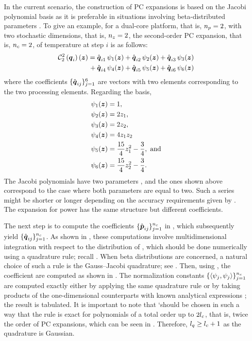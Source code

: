 In the current scenario, the construction of \ac{PC} expansions is based on the
Jacobi polynomial basis as it is preferable in situations involving
beta-distributed parameters \cite{xiu2010}. To give an example, for a dual-core
platform, that is, ${n_{p}} = 2$, with two stochastic dimensions, that is, ${n_{z}} =
2$, the second-order PC expansion, that is, ${n_{c}} = 2$, of temperature at step
$i$ is as follows:
\begin{equation} \elab{chaos-expansion-example}
  \begin{split}
    \chaos{2}{2}{\vq_i}(\vz)
    =    {} & \hat{\vq}_{i1} \, \psi_1(\vz) + \hat{\vq}_{i2} \, \psi_2(\vz) + \hat{\vq}_{i3} \, \psi_3(\vz) \\
    {} + {} & \hat{\vq}_{i4} \, \psi_4(\vz) + \hat{\vq}_{i5} \, \psi_5(\vz) + \hat{\vq}_{i6} \, \psi_6(\vz)
  \end{split}
\end{equation}
where the coefficients $\{ \hat{\boldsymbol{q}}_{ij} \}_{j = 1}^6$ are vectors with two
elements corresponding to the two processing elements. Regarding the basis,
\begin{align*}
  & \psi_1(\boldsymbol{z}) = 1, \\
  & \psi_2(\boldsymbol{z}) = 2 z_1, \\
  & \psi_3(\boldsymbol{z}) = 2 z_2, \\
  & \psi_4(\boldsymbol{z}) = 4 z_1 z_2 \\
  & \psi_5(\boldsymbol{z}) = \frac{15}{4} z_1^2 - \frac{3}{4}, \text{ and} \\
  & \psi_6(\boldsymbol{z}) = \frac{15}{4} z_2^2 - \frac{3}{4}.
\end{align*}
The Jacobi polynomials have two parameters \cite{xiu2010}, and the ones shown
above correspond to the case where both parameters are equal to two. Such a
series might be shorter or longer depending on the accuracy requirements given
by \lc. The expansion for power has the same structure but different
coefficients.

The next step is to compute the coefficients $\{ \hat{\boldsymbol{p}}_{ij} \}_{j = 1}^{n_{c}}$
in , which subsequently yield $\{ \hat{\boldsymbol{q}}_{ij} \}_{j =
1}^{n_{c}}$. As shown in , these computations involve
multidimensional integration with respect to the distribution of \vz, which
should be done numerically using a quadrature rule; recall
. When beta distributions are concerned, a natural
choice of such a rule is the Gauss--Jacobi quadrature; see
. Then, using , the
coefficient are computed as shown in . The normalization
constants $\{ \left\langle \psi_j, \psi_j \right\rangle \}_{j = 1}^{n_{c}}$ are computed exactly
either by applying the same quadrature rule or by taking products of the
one-dimensional counterparts with known analytical expressions \cite{xiu2010};
the result is tabulated. It is important to note that \lq should be chosen in
such a way that the rule is exact for polynomials of a total order up to $2
{l_{c}}$, that is, twice the order of \ac{PC} expansions, which can be seen in
 \cite{eldred2008}. Therefore, ${l_{q}} \geq {l_{c}} + 1$ as the
quadrature is Gaussian.

